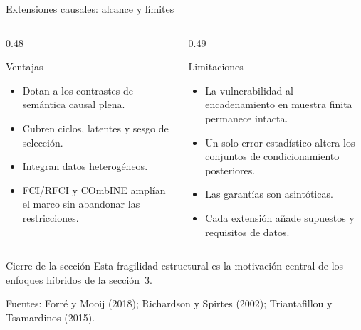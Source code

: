 \documentclass[aspectratio=169,11pt]{beamer}
\begin{document}
\begin{frame}[t]{Extensiones causales: alcance y límites}
  \begin{columns}[T,onlytextwidth]
    \begin{column}{0.48\textwidth}
      \begin{block}{Ventajas}
        \begin{itemize}
          \item Dotan a los contrastes de semántica causal plena.
          \item Cubren ciclos, latentes y sesgo de selección.
          \item Integran datos heterogéneos.
          \item FCI/RFCI y COmbINE amplían el marco sin abandonar las
                restricciones.
        \end{itemize}
      \end{block}
    \end{column}
    \begin{column}{0.49\textwidth}
      \begin{alertblock}{Limitaciones}
        \begin{itemize}
          \item La vulnerabilidad al encadenamiento en muestra finita
                permanece intacta.
          \item Un solo error estadístico altera los conjuntos de
                condicionamiento posteriores.
          \item Las garantías son asintóticas.
          \item Cada extensión añade supuestos y requisitos de datos.
        \end{itemize}
      \end{alertblock}
    \end{column}
  \end{columns}
  \vspace{0.1cm}
  \begin{exampleblock}{Cierre de la sección}
    Esta fragilidad estructural es la motivación central de los enfoques
    híbridos de la sección~3.
  \end{exampleblock}
  {\scriptsize\color{upmgray}Fuentes: Forré y Mooij (2018); Richardson y
  Spirtes (2002); Triantafillou y Tsamardinos (2015).}
\end{frame}

 
\end{document}

